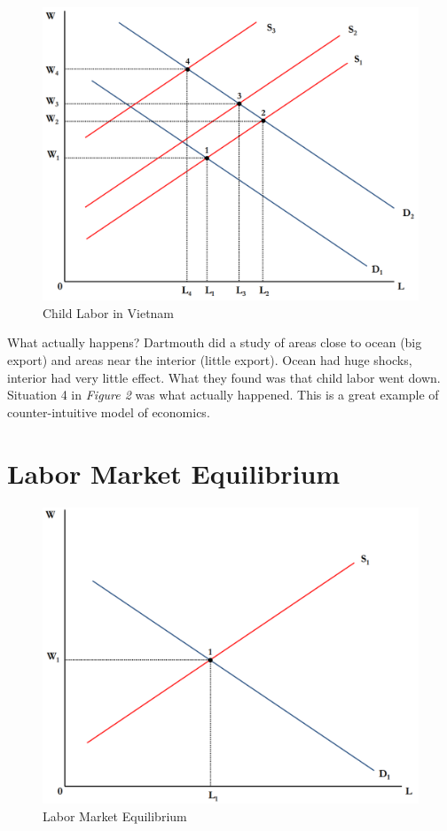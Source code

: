 \documentclass{article}
\begin{document}
\begin{figure}[H]
    \centering
    \includegraphics[scale=0.33]{"Figure 2"}
    \caption{Child Labor in Vietnam}
\end{figure}

What actually happens? Dartmouth did a study of areas close to ocean (big
export) and areas near the interior (little export). Ocean had huge shocks,
interior had very little effect. What they found was that child labor went down.
Situation 4 in \textit{Figure 2} was what actually happened. This is a great
example of counter-intuitive model of economics.

\section{Labor Market Equilibrium}

\begin{figure}[H]
    \centering
    \includegraphics[scale=0.33]{"Figure 3"}
    \caption{Labor Market Equilibrium}
\end{figure}
\end{document}
